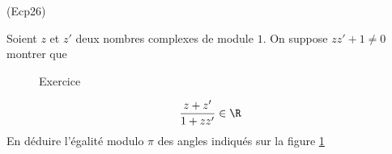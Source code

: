 \begin{tiny}(Ecp26)\end{tiny} Soient $z$ et $z'$ deux nombres complexes de module $1$. On suppose $zz'+1 \neq 0$ montrer que
\begin{figure}[htp]
 \centering
 
 \caption{Exercice }
 \label{fig:Ecp26_1}
\end{figure}
\begin{displaymath}
 \frac{z+z'}{1+zz'}\in \R
\end{displaymath}
En déduire l'égalité modulo $\pi$ des angles indiqués sur la figure \ref{fig:Ecp26_1}

